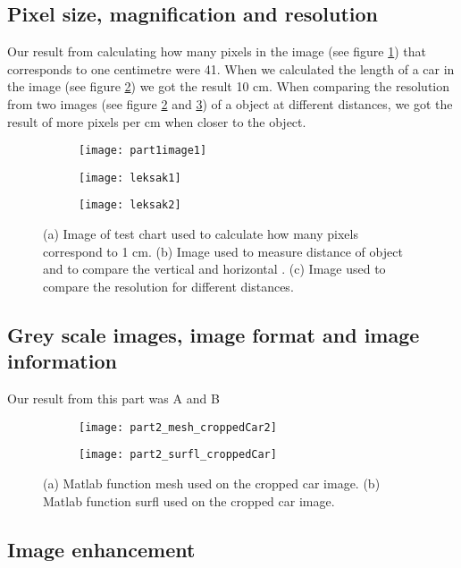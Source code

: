 \subsection{Pixel size, magnification and resolution}
Our result from calculating how many pixels in the image (see figure \ref{fig:TestChart}) that corresponds to one centimetre were 41. When we calculated the length of a car in the image (see figure \ref{fig:Toy1}) we got the result 10 cm. When comparing the resolution from two images (see figure \ref{fig:Toy1} and \ref{fig:Toy2}) of a object at different distances, we got the result of more pixels per cm when closer to the object.

\begin{figure}[h]
	\centering
	\begin{subfigure}[b]{0.3\textwidth}
		\texttt{[image: part1image1]}
		\caption{}
		\label{fig:TestChart}
	\end{subfigure}
	\begin{subfigure}[b]{0.3\textwidth}
		\texttt{[image: leksak1]}
		\caption{}
		\label{fig:Toy1}
	\end{subfigure}
	\begin{subfigure}[b]{0.3\textwidth}
		\texttt{[image: leksak2]}
		\caption{}
		\label{fig:Toy2}
	\end{subfigure}
	\caption{(a) Image of test chart used to calculate how many pixels correspond to 1 cm. (b) Image used to measure distance of object and to compare the vertical and horizontal . (c) Image used to compare the resolution for different distances.}
	\label{fig:part1}
\end{figure}

\subsection{Grey scale images, image format and image information}
Our result from this part was A and B

\begin{figure}[h]
\centering
	\begin{subfigure}[b]{0.4\textwidth}
		\texttt{[image: part2\_mesh\_croppedCar2]}
		\caption{}
		\label{fig:meshCar}
	\end{subfigure}
	\begin{subfigure}[b]{0.4\textwidth}	
		\texttt{[image: part2\_surfl\_croppedCar]}
		\caption{}
		\label{fig:surflCar}
	\end{subfigure}
	\caption{(a) Matlab function mesh used on the cropped car image. (b) Matlab function surfl used on the cropped car image. }
	\label{fig:part2}
\end{figure}

\subsection{Image enhancement}

